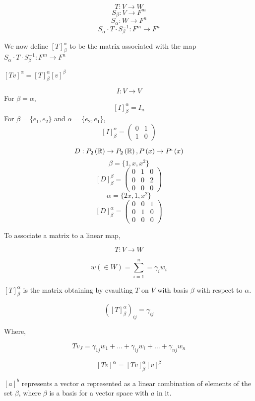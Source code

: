 \documentclass[11pt,a4paper]{colorart}
\def\l{\left}
\def\r{\right}
\def\R{\mathbb{R}}
\def\a{\alpha}
\def\b{\beta}
\def\g{\gamma}
\begin{document}
	   \[ T : V \rightarrow W \]	
	   \[ S_\b : V \rightarrow F^m \]	
	   \[ S_\a : W \rightarrow F^n \]	
	   \[ S_\a \cdot T \cdot S_\b^{-1}  : F^m \rightarrow F^n \]	

We now define $\l[T\r]_\b^\a$ to be the matrix associated with the map $S_\a \cdot T \cdot S_\b^{-1}  : F^m \rightarrow F^n$

\begin{conjecture}
	 $\l[Tv\r]^\a = \l[T\r]^\a_\b\l[v\r]^\b$
\end{conjecture}

\begin{example}
	\[ I:V\rightarrow V \]
	For $\b=\a$,
	\[ \l[I\r]^\a_\b = I_n \]
	For $\b = \{ e_1,e_2 \}$ and $\a = \{ e_2, e_1 \}$,
	\[ \l[I\r]^\a_\b = \begin{pmatrix} 0&1\\1&0\end{pmatrix} \]
\end{example}

\begin{example}[Differentiation]
	\[ D:P_2\l(\R\r) \rightarrow P_2\l(\R\r), P\l(x\r) \rightarrow P`\l(x\r) \]
	\[ \b = \{ 1, x, x^2 \} \]
	\[ \l[D\r]^\b_\b = \begin{pmatrix} 0&1&0\\0&0&2\\0&0&0\end{pmatrix} \]
	\[ \a = \{ 2x, 1, x^2 \} \]
	\[ \l[D\r]^\a_\b = \begin{pmatrix} 0&0&1\\0&1&0\\0&0&0\end{pmatrix} \]
\end{example}

To associate a matrix to a linear map,

\[ T: V \rightarrow W \]

\[ w \l( \in W \r) = \sum_{i=1}^n = \g_i w_i \]

$\l[ T \r]_\b^\a$ is the matrix obtaining by evaulting $T$ on $V$ with basis $\b$ with respect to $\a$.

\[ \l(\l[ T \r]_\b^\a\r)_{ij} = \g_{ij} \]

Where,

\[ Tv_J = \g_{1j} w_1 + \dots + \g_{ij} w_i +\dots + \g_{nj} w_n \]

\[ \l[Tv\r]^\a = \l[Tv\r]^\a_\b \l[v\r]^\b \]

\begin{convention}
	$\l[a\r]^b$ represents a vector $a$ represented as a linear combination of elements of the set $\b$, where $\b$ is a basis for a vector space with $a$ in it.
\end{convention}
\end{document}

